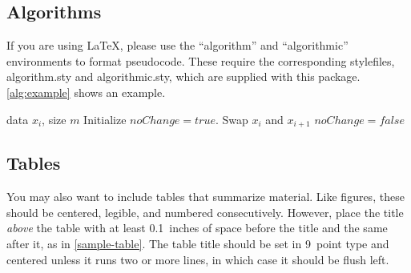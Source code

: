 \documentclass{article}
\theoremstyle{plain}
\theoremstyle{definition}
\theoremstyle{remark}
\begin{document}
\subsection{Algorithms}

If you are using \LaTeX, please use the ``algorithm'' and ``algorithmic''
environments to format pseudocode. These require the corresponding stylefiles,
algorithm.sty and algorithmic.sty, which are supplied with this package.
\cref{alg:example} shows an example.

\begin{algorithm}[tb]
  \caption{Bubble Sort}
  \label{alg:example}
  \begin{algorithmic}
     data $x_i$, size $m$
    \REPEAT
    \STATE Initialize $noChange = true$.
    \STATE Swap $x_i$ and $x_{i+1}$
    \STATE $noChange = false$
    \ENDIF
    \ENDFOR
  \end{algorithmic}
\end{algorithm}


\subsection{Tables}

You may also want to include tables that summarize material. Like figures,
these should be centered, legible, and numbered consecutively. However, place
the title \emph{above} the table with at least 0.1~inches of space before the
title and the same after it, as in \cref{sample-table}. The table title should
be set in 9~point type and centered unless it runs two or more lines, in which
case it should be flush left.

\end{document}
